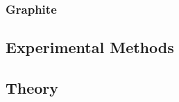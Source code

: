 \documentclass[aps,reprint,superscriptaddress]{revtex4-2}
\begin{document}
\subsubsection{Graphite}
\subsection{Experimental Methods}
\subsection{Theory}

\nocite{*}





\vfill
\end{document}
